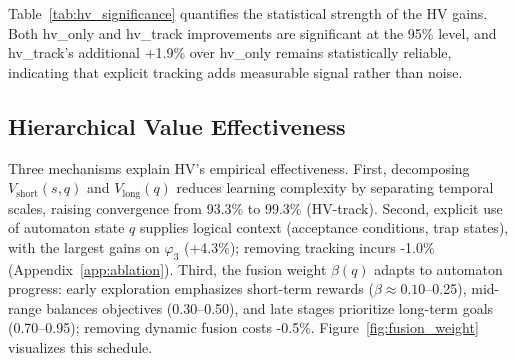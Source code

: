 \documentclass{article}
\begin{document}
\begin{table}[t]
\centering
\caption{HV Improvements with 95\% Confidence Intervals (500 evaluation episodes)}
\label{tab:hv_significance}
\end{table}

Table~\ref{tab:hv_significance} quantifies the statistical strength of the HV gains. Both hv\_only and hv\_track improvements are significant at the 95\% level, and hv\_track's additional +1.9\% over hv\_only remains statistically reliable, indicating that explicit tracking adds measurable signal rather than noise.




\subsection{Hierarchical Value Effectiveness}

Three mechanisms explain HV's empirical effectiveness. First, decomposing $V_{\text{short}}(s,q)$ and $V_{\text{long}}(q)$ reduces learning complexity by separating temporal scales, raising convergence from 93.3\% to 99.3\% (HV-track). Second, explicit use of automaton state $q$ supplies logical context (acceptance conditions, trap states), with the largest gains on $\varphi_3$ (+4.3\%); removing tracking incurs -1.0\% (Appendix~\ref{app:ablation}). Third, the fusion weight $\beta(q)$ adapts to automaton progress: early exploration emphasizes short-term rewards ($\beta \approx 0.10$--0.25), mid-range balances objectives (0.30--0.50), and late stages prioritize long-term goals (0.70--0.95); removing dynamic fusion costs -0.5\%. Figure~\ref{fig:fusion_weight} visualizes this schedule.
\end{document}
